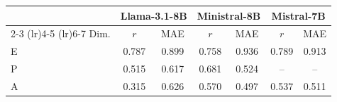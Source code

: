 \begin{tabular}{lcccccc}
\toprule
& \multicolumn{2}{c}{Llama-3.1-8B} & \multicolumn{2}{c}{Ministral-8B} & \multicolumn{2}{c}{Mistral-7B} \\
\cmidrule(lr){2-3} \cmidrule(lr){4-5} \cmidrule(lr){6-7}
Dim. & $r$ & MAE & $r$ & MAE & $r$ & MAE \\
\midrule
E & 0.787 & 0.899 & 0.758 & 0.936 & 0.789 & 0.913 \\
P & 0.515 & 0.617 & 0.681 & 0.524 & -- & -- \\
A & 0.315 & 0.626 & 0.570 & 0.497 & 0.537 & 0.511 \\
\bottomrule
\end{tabular}
